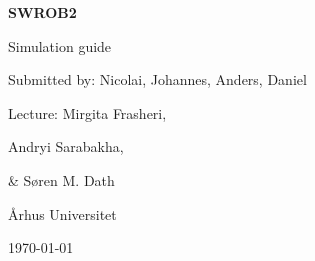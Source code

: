 \begin{titlepage}
	\centering
	\vspace*{6cm}
	{\Huge\bfseries SWROB2\par Simulation guide\par}
	\vspace{2cm}
	Submitted by: Nicolai, Johannes, Anders, Daniel \par \vspace{1cm}
	Lecture: Mirgita Frasheri,\par Andryi Sarabakha,\par \& Søren M. Dath\par \vspace{2cm}
	\vspace{4cm}
	Århus Universitet \par
	
	\vfill
	\today
\end{titlepage}
\thispagestyle{empty}
\tableofcontents
\clearpage